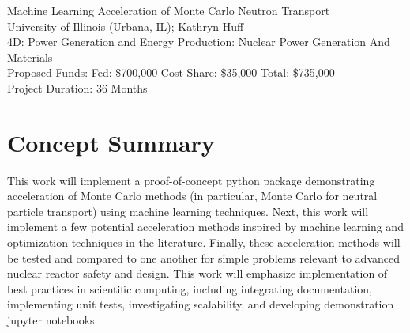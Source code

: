 \documentclass[letterpaper,12pt]{article}
\date{}
\newcommand*\fourteenpt{\fontsize{14}{15.5}\selectfont}
\begin{document}
\thispagestyle{fancy}
\begin{center}
{\fourteenpt Machine Learning Acceleration of Monte Carlo Neutron Transport}\\
\vspace{3mm}
University of Illinois (Urbana, IL); Kathryn Huff\\
\vspace{3mm}
4D: Power Generation and Energy Production: Nuclear Power Generation And Materials\\
Proposed Funds: Fed: \$700,000\/ Cost Share: \$35,000\/ Total: \$735,000\\
Project Duration: 36 Months\\
\end{center}

\section{Concept Summary}


This work will implement a proof-of-concept python package demonstrating
acceleration of Monte Carlo methods (in particular, Monte Carlo for neutral
particle transport) using machine learning techniques.
Next, this work will implement a few potential acceleration methods inspired by machine
learning and optimization techniques in the literature.
Finally, these acceleration methods will be tested and compared to one another for simple
problems relevant to advanced nuclear reactor safety and design.
This work will emphasize implementation of best practices in
scientific computing, including integrating documentation, implementing unit
tests, investigating scalability, and developing demonstration jupyter
notebooks.
\end{document}
